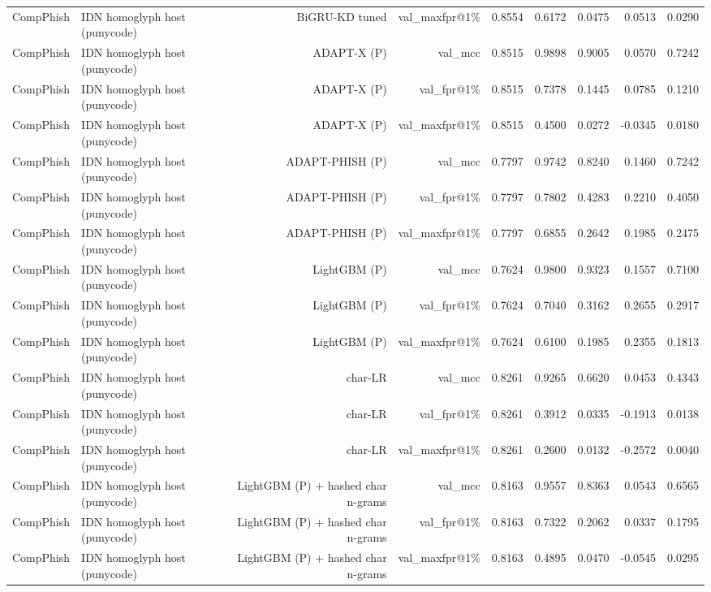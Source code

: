 \begin{table}[t]
\begin{tabular}{llrrrrrrr}
CompPhish & IDN homoglyph host (punycode) & BiGRU-KD tuned & val\_maxfpr@1\% & 0.8554 & 0.6172 & 0.0475 & 0.0513 & 0.0290 \\
CompPhish & IDN homoglyph host (punycode) & ADAPT-X (P) & val\_mcc & 0.8515 & 0.9898 & 0.9005 & 0.0570 & 0.7242 \\
CompPhish & IDN homoglyph host (punycode) & ADAPT-X (P) & val\_fpr@1\% & 0.8515 & 0.7378 & 0.1445 & 0.0785 & 0.1210 \\
CompPhish & IDN homoglyph host (punycode) & ADAPT-X (P) & val\_maxfpr@1\% & 0.8515 & 0.4500 & 0.0272 & -0.0345 & 0.0180 \\
CompPhish & IDN homoglyph host (punycode) & ADAPT-PHISH (P) & val\_mcc & 0.7797 & 0.9742 & 0.8240 & 0.1460 & 0.7242 \\
CompPhish & IDN homoglyph host (punycode) & ADAPT-PHISH (P) & val\_fpr@1\% & 0.7797 & 0.7802 & 0.4283 & 0.2210 & 0.4050 \\
CompPhish & IDN homoglyph host (punycode) & ADAPT-PHISH (P) & val\_maxfpr@1\% & 0.7797 & 0.6855 & 0.2642 & 0.1985 & 0.2475 \\
CompPhish & IDN homoglyph host (punycode) & LightGBM (P) & val\_mcc & 0.7624 & 0.9800 & 0.9323 & 0.1557 & 0.7100 \\
CompPhish & IDN homoglyph host (punycode) & LightGBM (P) & val\_fpr@1\% & 0.7624 & 0.7040 & 0.3162 & 0.2655 & 0.2917 \\
CompPhish & IDN homoglyph host (punycode) & LightGBM (P) & val\_maxfpr@1\% & 0.7624 & 0.6100 & 0.1985 & 0.2355 & 0.1813 \\
CompPhish & IDN homoglyph host (punycode) & char-LR & val\_mcc & 0.8261 & 0.9265 & 0.6620 & 0.0453 & 0.4343 \\
CompPhish & IDN homoglyph host (punycode) & char-LR & val\_fpr@1\% & 0.8261 & 0.3912 & 0.0335 & -0.1913 & 0.0138 \\
CompPhish & IDN homoglyph host (punycode) & char-LR & val\_maxfpr@1\% & 0.8261 & 0.2600 & 0.0132 & -0.2572 & 0.0040 \\
CompPhish & IDN homoglyph host (punycode) & LightGBM (P) + hashed char n-grams & val\_mcc & 0.8163 & 0.9557 & 0.8363 & 0.0543 & 0.6565 \\
CompPhish & IDN homoglyph host (punycode) & LightGBM (P) + hashed char n-grams & val\_fpr@1\% & 0.8163 & 0.7322 & 0.2062 & 0.0337 & 0.1795 \\
CompPhish & IDN homoglyph host (punycode) & LightGBM (P) + hashed char n-grams & val\_maxfpr@1\% & 0.8163 & 0.4895 & 0.0470 & -0.0545 & 0.0295 \\

\end{tabular}
\end{table}
